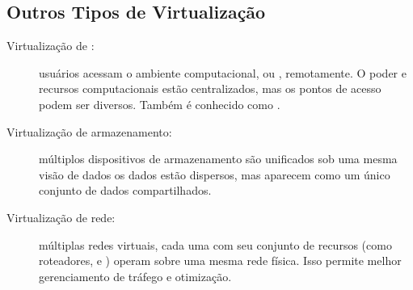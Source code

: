 \subsection{Outros Tipos de Virtualização}
\begin{description}
    \item [Virtualização de \desktop:] usuários acessam o ambiente computacional, ou \desktop, remotamente. O poder e recursos computacionais estão centralizados, mas os pontos de acesso podem ser diversos. Também é conhecido como \vdi.
    \item [Virtualização de armazenamento:] múltiplos dispositivos de armazenamento são unificados sob uma mesma visão de dados \ie os dados estão dispersos, mas aparecem como um único conjunto de dados compartilhados.
    \item [Virtualização de rede:] múltiplas redes virtuais, cada uma com seu conjunto de recursos (como roteadores, \switches e \firewalls) operam sobre uma mesma rede física. Isso permite melhor gerenciamento de tráfego e otimização.
\end{description}

